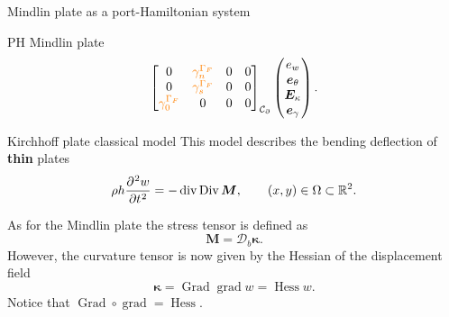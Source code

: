 \documentclass[aspectratio=169]{ISAE-Beamer}
\DeclareMathOperator*{\grad}{grad}
\DeclareMathOperator*{\Grad}{Grad}
\DeclareMathOperator*{\Div}{Div}
\renewcommand{\div}{\operatorname{div}}
\DeclareMathOperator*{\Hess}{Hess}
\newcommand{\bbR}{\mathbb{R}}
\begin{document}
\begin{frame}{Mindlin plate as a port-Hamiltonian system}
\begin{block}{PH Mindlin plate}
\begin{equation*}
\begin{aligned}
{\begin{bmatrix}
			{0} & \textcolor{orange}{\gamma_{n}^{\Gamma_F}} & {0} & {0} \\
			{0} & \textcolor{orange}{\gamma_{s}^{\Gamma_F}} & {0} & {0} \\
			\textcolor{orange}{\gamma_{0}^{\Gamma_F}} & {0} & {0} & {0} \\
			\end{bmatrix}}_{\mathcal{C}_\partial}
		\begin{pmatrix}
		e_w \\
		\bm{e}_{\theta} \\
		\bm{E}_{\kappa} \\
		\bm{e}_{\gamma} \\
		\end{pmatrix}.
		\end{aligned}
		\end{equation*}
	\end{block}
\end{frame}

\begin{frame}{Kirchhoff plate classical model}
	This model describes the bending deflection of \textbf{thin} plates
	\begin{equation*}
	\rho h \diffp[2]{w}{t} = - \div\Div \bm{M}, \qquad (x,y) \in \Omega \subset \bbR^2.
	\end{equation*}

	As for the Mindlin plate the stress tensor is defined as 
	$$\bm{M} = \bm{\mathcal{D}}_b \bm{\kappa}.$$
	However, the curvature tensor is now given by the Hessian of the displacement field
	$$\bm{\kappa} = \Grad\grad w = \Hess w.$$
	Notice that $\Grad \circ \grad = \Hess$.
\end{frame}
\end{document}
